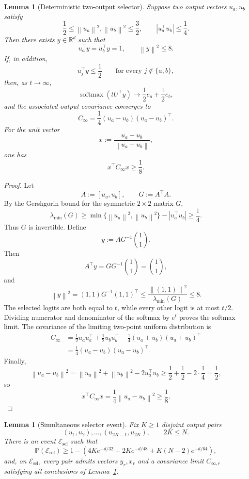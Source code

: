 \documentclass[11pt]{article}
\newtheorem{lemma}[theorem]{Lemma}
\newcommand{\R}{\mathbb{R}}
\newcommand{\Pp}{\mathbb{P}}
\newcommand{\1}{\mathbf{1}}
\newcommand{\softmax}{\operatorname{softmax}}
\newcommand{\norm}[1]{\left\|#1\right\|}
\newcommand{\abs}[1]{\left|#1\right|}
\begin{document}
\begin{lemma}[Deterministic two-output selector]
\label{lem:deterministic-selector}
Suppose two output vectors \(u_a,u_b\) satisfy
\[
 \frac12\le\norm{u_a}^2,\norm{u_b}^2\le\frac32,
 \qquad
 \abs{u_a^\top u_b}\le\frac14.
\]
Then there exists \(y\in\R^d\) such that
\[
 u_a^\top y=u_b^\top y=1,
 \qquad
 \norm{y}^2\le8.
\]
If, in addition,
\[
 u_j^\top y\le\frac12
 \qquad\text{for every }j\notin\{a,b\},
\]
then, as \(t\to\infty\),
\[
 \softmax(tU^\top y)
 \longrightarrow
 \frac12e_a+\frac12e_b,
\]
and the associated output covariance converges to
\[
 C_\infty
 =
 \frac14(u_a-u_b)(u_a-u_b)^\top.
\]
For the unit vector
\[
 x:=\frac{u_a-u_b}{\norm{u_a-u_b}},
\]
one has
\[
 x^\top C_\infty x\ge\frac18.
\]
\end{lemma}

\begin{proof}
Let
\[
 A:=[u_a,u_b],
 \qquad
 G:=A^\top A.
\]
By the Gershgorin bound for the symmetric \(2\times2\) matrix \(G\),
\[
 \lambda_{\min}(G)
 \ge
 \min\{\norm{u_a}^2,\norm{u_b}^2\}
 -\abs{u_a^\top u_b}
 \ge\frac14.
\]
Thus \(G\) is invertible.  Define
\[
 y:=AG^{-1}\binom11.
\]
Then
\[
 A^\top y=GG^{-1}\binom11=\binom11,
\]
and
\[
 \norm{y}^2
 =(1,1)G^{-1}(1,1)^\top
 \le
 \frac{\norm{(1,1)}^2}{\lambda_{\min}(G)}
 \le8.
\]
The selected logits are both equal to \(t\), while every other logit is at
most \(t/2\).  Dividing numerator and denominator of the softmax by \(e^t\)
proves the softmax limit.  The covariance of the limiting two-point uniform
distribution is
\begin{align*}
 C_\infty
 &=
 \frac12u_au_a^\top+\frac12u_bu_b^\top
 -\frac14(u_a+u_b)(u_a+u_b)^\top\\
 &=
 \frac14(u_a-u_b)(u_a-u_b)^\top.
\end{align*}
Finally,
\[
 \norm{u_a-u_b}^2
 =
 \norm{u_a}^2+\norm{u_b}^2-2u_a^\top u_b
 \ge
 \frac12+\frac12-2\cdot\frac14
 =\frac12,
\]
so
\[
 x^\top C_\infty x
 =\frac14\norm{u_a-u_b}^2
 \ge\frac18.
\]
\end{proof}

\begin{lemma}[Simultaneous selector event]
\label{lem:simultaneous-selector}
Fix \(K\ge1\) disjoint output pairs
\[
 (u_1,u_2),\ldots,(u_{2K-1},u_{2K}),
 \qquad 2K\le N.
\]
There is an event \(\mathcal E_{\mathrm{sel}}\) such that
\[
 \Pp(\mathcal E_{\mathrm{sel}})
 \ge
 1-
 \left(
 4K e^{-d/32}
 +2K e^{-d/48}
 +K(N-2)e^{-d/64}
 \right),
\]
and, on \(\mathcal E_{\mathrm{sel}}\), every pair admits vectors
\(y_r,x_r\) and a covariance limit \(C_{\infty,r}\) satisfying all
conclusions of Lemma~\ref{lem:deterministic-selector}.
\end{lemma}
\end{document}
